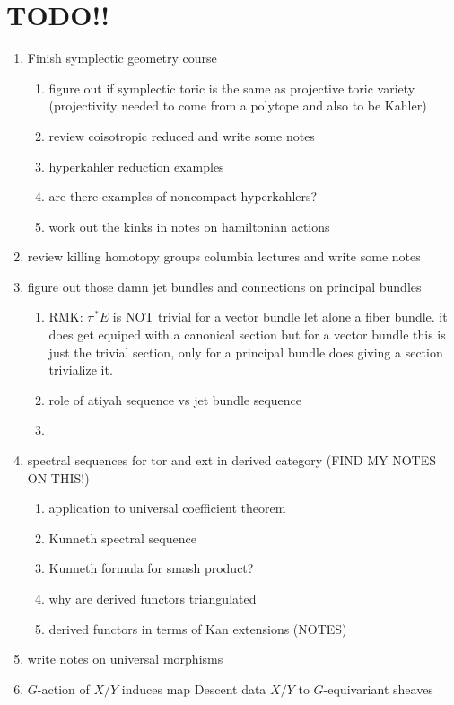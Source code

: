 \documentclass[12pt]{article}
\begin{document}
\section{TODO!!}

\begin{enumerate}
\item Finish symplectic geometry course
\begin{enumerate}
\item figure out if symplectic toric is the same as projective toric variety (projectivity needed to come from a polytope and also to be Kahler)
\item review coisotropic reduced and write some notes
\item hyperkahler reduction examples 
\item are there examples of noncompact hyperkahlers?
\item work out the kinks in notes on hamiltonian actions
\end{enumerate}
\item review killing homotopy groups columbia lectures and write some notes
\item figure out those damn jet bundles and connections on principal bundles
\begin{enumerate}
\item RMK: $\pi^* E$ is NOT trivial for a vector bundle let alone a fiber bundle. it does get equiped with a canonical section but for a vector bundle this is just the trivial section, only for a principal bundle does giving a section trivialize it.
\item role of atiyah sequence vs jet bundle sequence
\item 
\end{enumerate}
\item spectral sequences for tor and ext in derived category (FIND MY NOTES ON THIS!)
\begin{enumerate}
\item application to universal coefficient theorem
\item Kunneth spectral sequence
\item Kunneth formula for smash product?
\item why are derived functors triangulated
\item derived functors in terms of Kan extensions (NOTES)
\end{enumerate}
\item write notes on universal morphisms
\item $G$-action of $X/Y$ induces map Descent data $X/Y$ to $G$-equivariant sheaves

\end{enumerate}
\end{document}
